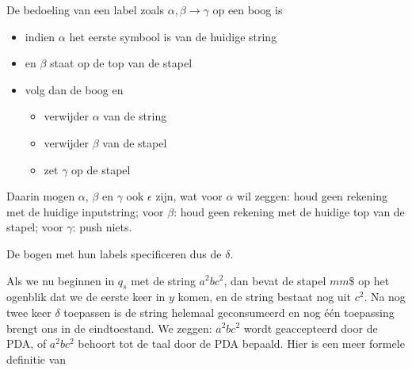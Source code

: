 De bedoeling van een label zoals $\alpha,\beta \rightarrow \gamma$ op
een boog is

\begin{itemize}
\item indien $\alpha$ het eerste symbool is van de huidige string
\item en $\beta$ staat op de top van de stapel
\item volg dan de boog en
\begin{itemize}
\item verwijder $\alpha$ van de string
\item verwijder $\beta$ van de stapel
\item zet $\gamma$ op de stapel
\end{itemize}

\end{itemize}

Daarin mogen $\alpha$, $\beta$ en $\gamma$ ook $\epsilon$ zijn, wat voor
$\alpha$ wil zeggen: houd geen rekening met de huidige inputstring;
voor $\beta$: houd geen rekening met de huidige top van de stapel; voor
$\gamma$: push niets.

De bogen met hun labels specificeren dus de $\delta$.

Als we nu beginnen in $q_s$ met de string $a^2bc^2$, dan bevat de
stapel $mm\$$ op het ogenblik dat we de eerste keer in $y$ komen, en
de string bestaat nog uit $c^2$. Na nog twee keer $\delta$ toepassen
is de string helemaal geconsumeerd en nog \'{e}\'{e}n toepassing
brengt ons in de eindtoestand.  We zeggen: $a^2bc^2$ wordt
geaccepteerd door de PDA, of $a^2bc^2$ behoort tot de taal door de PDA
bepaald. Hier is een meer formele definitie van



